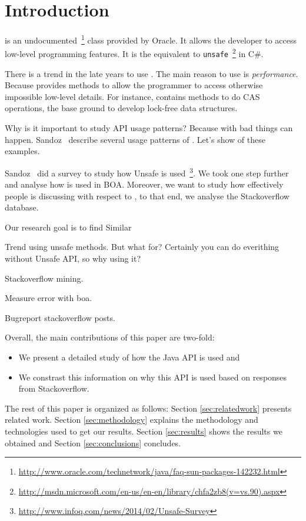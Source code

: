 
\section{Introduction} \label{sec:introduction}

\smu{} is an undocumented~\footnote{\url{http://www.oracle.com/technetwork/java/faq-sun-packages-142232.html}} class provided by Oracle.
It allows the developer to access low-level programming features.
It is the equivalent to \texttt{unsafe}~\footnote{\url{http://msdn.microsoft.com/en-us/en-en/library/chfa2zb8(v=vs.90).aspx}} in C\#.

There is a trend in the late years to use \smu{}.
The main reason to use \smu{} is \emph{performance}.
Because \smu{} provides methods to allow the programmer to access otherwise impossible low-level details.
For instance, \smu{} contains methods to do CAS operations, the base ground to develop lock-free data structures.

Why is it important to study \smu{} API usage patterns? Because with \smu{} bad things can happen.
Sandoz~\cite{psandoz14} describe several usage patterns of \smu{}. Let's show of these examples.

Sandoz~\cite{psandoz14} did a survey to study how Unsafe is used~\footnote{\url{http://www.infoq.com/news/2014/02/Unsafe-Survey}}.
We took one step further and analyse how \smu{} is used in BOA. Moreover, we want to study how effectively people is discussing with respect to \smu{}, to that end, we analyse the Stackoverflow database.

Our research goal is to find 
Similar \cite{Dyer-Rajan-Nguyen-Nguyen-14}

Trend using unsafe methods. But what for? Certainly you can do everithing without Unsafe API, so why using it? 

 
Stackoverflow mining.

Measure error with boa.


Bugreport stackoverflow posts.


Overall, the main contributions of this paper are two-fold:
\begin{itemize}
\item We present a detailed study of how the Java \smu{} API is used and
\item We constrast this information on why this API is used based on responses from Stackoverflow.
\end{itemize}

The rest of this paper is organized as follows:
Section \ref{sec:relatedwork} presents related work.
Section \ref{sec:methodology} explains the methodology and technologies used to get our results.
Section \ref{sec:results} shows the results we obtained and Section \ref{sec:conclusions} concludes.
